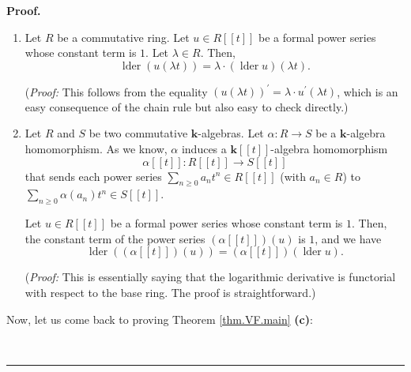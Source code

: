 \documentclass[numbers=enddot,12pt,final,onecolumn,notitlepage]{scrartcl}%
\theoremstyle{definition}
\newenvironment{proof}[1][Proof]{\noindent\textbf{#1.} }{\ \rule{0.5em}{0.5em}}
\let\sumnonlimits\sum
\renewcommand{\sum}{\sumnonlimits\limits}
\newenvironment{vershort}{}{}
\begin{document}
\begin{vershort}
\begin{proof}
\begin{enumerate}
(\textit{Proof:} This is the \textquotedblleft$n\rightarrow\infty
$\textquotedblright\ limit of Property 3. Use Property 2 to pass to this limit.)

\item Let $R$ be a commutative ring. Let $u\in R\left[  \left[  t\right]
\right]  $ be a formal power series whose constant term is $1$. Let
$\lambda\in R$. Then,%
\[
\operatorname*{lder}\left(  u\left(  \lambda t\right)  \right)  =\lambda
\cdot\left(  \operatorname*{lder}u\right)  \left(  \lambda t\right)  .
\]


(\textit{Proof:} This follows from the equality $\left(  u\left(  \lambda
t\right)  \right)  ^{\prime}=\lambda\cdot u^{\prime}\left(  \lambda t\right)
$, which is an easy consequence of the chain rule but also easy to check directly.)

\item Let $R$ and $S$ be two commutative $\mathbf{k}$-algebras. Let
$\alpha:R\rightarrow S$ be a $\mathbf{k}$-algebra homomorphism. As we know,
$\alpha$ induces a $\mathbf{k}\left[  \left[  t\right]  \right]  $-algebra
homomorphism%
\[
\alpha\left[  \left[  t\right]  \right]  :R\left[  \left[  t\right]  \right]
\rightarrow S\left[  \left[  t\right]  \right]
\]
that sends each power series $\sum_{n\geq0}a_{n}t^{n}\in R\left[  \left[
t\right]  \right]  $ (with $a_{n}\in R$) to $\sum_{n\geq0}\alpha\left(
a_{n}\right)  t^{n}\in S\left[  \left[  t\right]  \right]  $.

Let $u\in R\left[  \left[  t\right]  \right]  $ be a formal power series whose
constant term is $1$. Then, the constant term of the power series $\left(
\alpha\left[  \left[  t\right]  \right]  \right)  \left(  u\right)  $ is $1$,
and we have%
\[
\operatorname*{lder}\left(  \left(  \alpha\left[  \left[  t\right]  \right]
\right)  \left(  u\right)  \right)  =\left(  \alpha\left[  \left[  t\right]
\right]  \right)  \left(  \operatorname*{lder}u\right)  .
\]


(\textit{Proof:} This is essentially saying that the logarithmic derivative is
functorial with respect to the base ring. The proof is straightforward.)
\end{enumerate}

Now, let us come back to proving Theorem \ref{thm.VF.main} \textbf{(c)}:


\end{proof}
\end{vershort}
\end{document}
